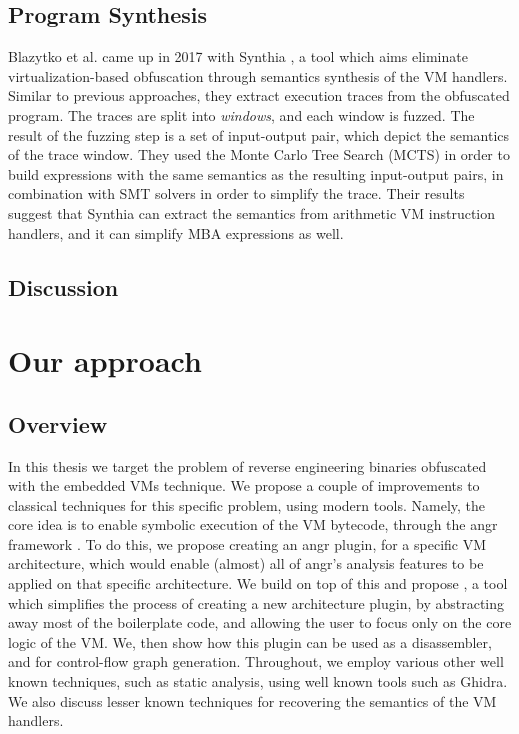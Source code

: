 \section{Program Synthesis}

Blazytko et al. came up in 2017 with Synthia \cite{blazytko2017}, a tool which aims eliminate virtualization-based obfuscation through semantics synthesis of the \gls{VM} handlers. Similar to previous approaches, they extract execution traces from the obfuscated program. The traces are split into \emph{windows}, and each window is fuzzed. The result of the fuzzing step is a set of input-output pair, which depict the semantics of the trace window. They used the Monte Carlo Tree Search (MCTS) in order to build expressions with the same semantics as the resulting input-output pairs, in combination with SMT solvers in order to simplify the trace. Their results suggest that Synthia can extract the semantics from arithmetic \gls{VM} instruction handlers, and it can simplify \gls{MBA} expressions as well.


\section{Discussion}




\chapter{Our approach}

\section{Overview}

In this thesis we target the problem of reverse engineering binaries obfuscated with the embedded \glspl{VM} technique. We propose a couple of improvements to classical techniques for this specific problem, using modern tools. Namely, the core idea is to enable symbolic execution of the VM bytecode, through the angr framework \cite{angr}. To do this, we propose creating an angr plugin, for a specific VM architecture, which would enable (almost) all of angr's analysis features to be applied on that specific architecture. We build on top of this and propose , a tool which simplifies the process of creating a new architecture plugin, by abstracting away most of the boilerplate code, and allowing the user to focus only on the core logic of the \gls{VM}. We, then show how this plugin can be used as a disassembler, and for control-flow graph generation. Throughout, we employ various other well known techniques, such as static analysis, using well known tools such as Ghidra. We also discuss lesser known techniques for recovering the semantics of the \gls{VM} handlers.

